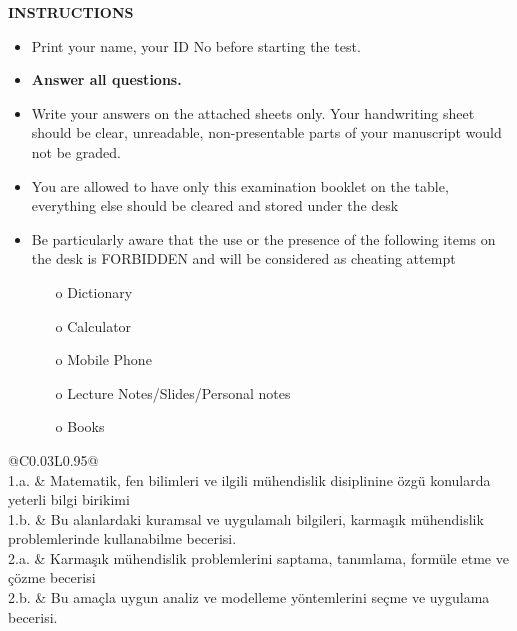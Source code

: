 \documentclass[a4paper, 11pt]{article}
\begin{document}
	\begin{center}
		\large
		\textbf{INSTRUCTIONS}
	\end{center}
	\begin{itemize}
		\setlength{\itemsep}{0pt}
		\setlength{\parskip}{1pt}
		\item Print your name, your ID No before starting the test.
		\item \textbf{Answer all questions.}
		\item Write your answers on the attached sheets only. Your handwriting sheet should be clear, unreadable, non-presentable parts of your manuscript would not be graded.
		\item You are allowed to have only this examination booklet on the table, everything else should be cleared and stored under the desk
		\item Be particularly aware that the use or the presence of the following items on the desk is FORBIDDEN and will be considered as cheating attempt
		\begin{itemize}
			\setlength{\itemsep}{0pt}
			\setlength{\parskip}{1pt}
			\item[o] Dictionary
			\item[o] Calculator
			\item[o] Mobile Phone
			\item[o] Lecture Notes/Slides/Personal notes
			\item[o] Books
		\end{itemize}
	\end{itemize}
	
	\begin{table}[hb!]
		\centering
		\begin{tabular}{@{}C{0.03\linewidth}L{0.95\linewidth}@{}}
			\toprule
			 \\
			\midrule
			1.a. & Matematik, fen bilimleri ve ilgili mühendislik disiplinine özgü konularda yeterli bilgi birikimi \\
			1.b. & Bu alanlardaki kuramsal ve uygulamalı bilgileri, karmaşık mühendislik problemlerinde kullanabilme becerisi. \\
			\midrule
			2.a. & Karmaşık mühendislik problemlerini saptama, tanımlama, formüle etme ve çözme becerisi \\
			2.b. & Bu amaçla uygun analiz ve modelleme yöntemlerini seçme ve uygulama becerisi. \\
			\bottomrule
		\end{tabular}
	\end{table}
\end{document}

